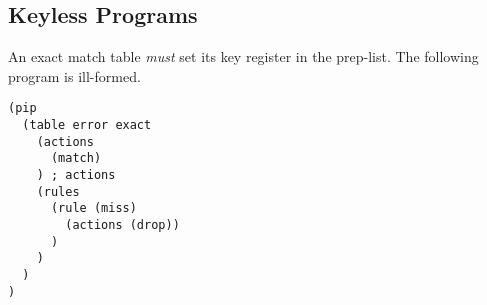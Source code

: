 \subsection{Keyless Programs}
An exact match table \textit{must} set its key register in the prep-list. The following program is ill-formed.
\begin{verbatim}
(pip
  (table error exact
    (actions
      (match)
    ) ; actions
    (rules
      (rule (miss)
        (actions (drop))
      )
    )
  )
)
\end{verbatim}
